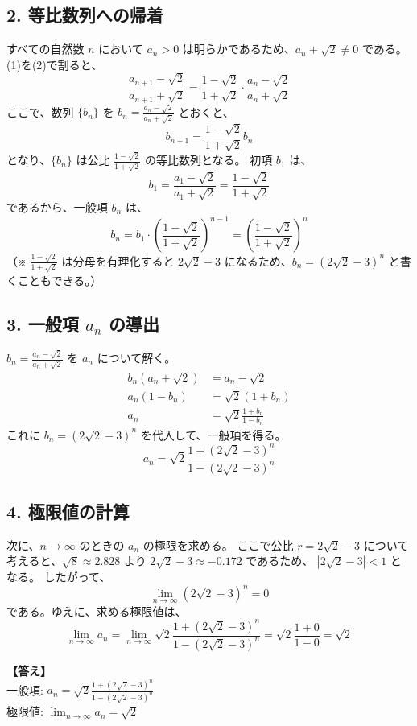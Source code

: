 \documentclass[a4paper,11pt]{jsarticle}
\begin{document}
\subsection*{2. 等比数列への帰着}
すべての自然数 $n$ において $a_n > 0$ は明らかであるため、$a_n + \sqrt{2} \neq 0$ である。(1)を(2)で割ると、
\[
\frac{a_{n+1} - \sqrt{2}}{a_{n+1} + \sqrt{2}} = \frac{1 - \sqrt{2}}{1 + \sqrt{2}} \cdot \frac{a_n - \sqrt{2}}{a_n + \sqrt{2}}
\]
ここで、数列 $\{b_n\}$ を $b_n = \frac{a_n - \sqrt{2}}{a_n + \sqrt{2}}$ とおくと、
\[
b_{n+1} = \frac{1 - \sqrt{2}}{1 + \sqrt{2}} b_n
\]
となり、$\{b_n\}$ は公比 $\frac{1 - \sqrt{2}}{1 + \sqrt{2}}$ の等比数列となる。
初項 $b_1$ は、
\[
b_1 = \frac{a_1 - \sqrt{2}}{a_1 + \sqrt{2}} = \frac{1 - \sqrt{2}}{1 + \sqrt{2}}
\]
であるから、一般項 $b_n$ は、
\[
b_n = b_1 \cdot \left( \frac{1 - \sqrt{2}}{1 + \sqrt{2}} \right)^{n-1} = \left( \frac{1 - \sqrt{2}}{1 + \sqrt{2}} \right)^n
\]
（※ $\frac{1 - \sqrt{2}}{1 + \sqrt{2}}$ は分母を有理化すると $2\sqrt{2} - 3$ になるため、$b_n = (2\sqrt{2} - 3)^n$ と書くこともできる。）

\subsection*{3. 一般項 $a_n$ の導出}
$b_n = \frac{a_n - \sqrt{2}}{a_n + \sqrt{2}}$ を $a_n$ について解く。
\begin{align*}
b_n (a_n + \sqrt{2}) &= a_n - \sqrt{2} \\
a_n(1 - b_n) &= \sqrt{2}(1 + b_n) \\
a_n &= \sqrt{2} \frac{1 + b_n}{1 - b_n}
\end{align*}
これに $b_n = (2\sqrt{2} - 3)^n$ を代入して、一般項を得る。
\[
a_n = \sqrt{2} \frac{1 + (2\sqrt{2} - 3)^n}{1 - (2\sqrt{2} - 3)^n}
\]

\subsection*{4. 極限値の計算}
次に、$n \to \infty$ のときの $a_n$ の極限を求める。
ここで公比 $r = 2\sqrt{2} - 3$ について考えると、$\sqrt{8} \approx 2.828$ より $2\sqrt{2} - 3 \approx -0.172$ であるため、
$|2\sqrt{2} - 3| < 1$ となる。
したがって、
\[
\lim_{n \to \infty} (2\sqrt{2} - 3)^n = 0
\]
である。ゆえに、求める極限値は、
\[
\lim_{n \to \infty} a_n = \lim_{n \to \infty} \sqrt{2} \frac{1 + (2\sqrt{2} - 3)^n}{1 - (2\sqrt{2} - 3)^n} = \sqrt{2} \frac{1 + 0}{1 - 0} = \sqrt{2}
\]

\vspace{1em}
\noindent\textbf{【答え】}\\
一般項: $\displaystyle a_n = \sqrt{2} \frac{1 + (2\sqrt{2} - 3)^n}{1 - (2\sqrt{2} - 3)^n}$ \\[1em]
極限値: $\displaystyle \lim_{n \to \infty} a_n = \sqrt{2}$
\end{document}

